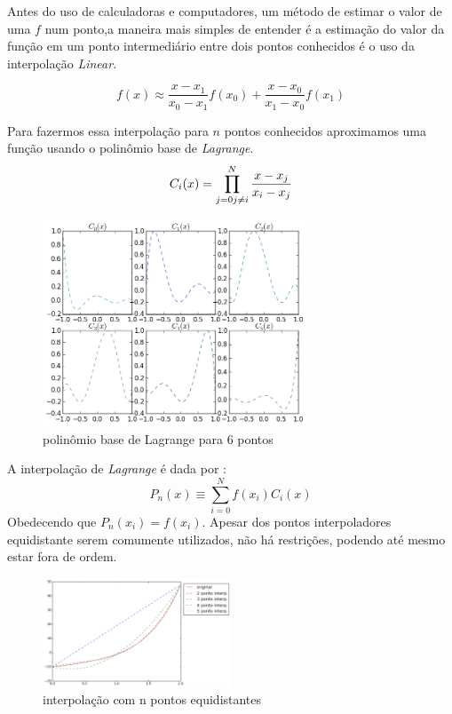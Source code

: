 Antes do uso de calculadoras e computadores, um método de estimar o valor de uma $f$ num ponto,a   maneira mais simples de entender é a estimação do valor da função em um ponto intermediário entre dois pontos conhecidos é o uso da interpolação \emph{Linear}.

\begin{equation}
	f(x) \approx \frac{x - x_1}{x_0 - x_1}f(x_0)  + \frac{x - x_0}{x_1 - x_0}f(x_1)
\end{equation} 
 
 Para fazermos essa interpolação para $n$ pontos conhecidos aproximamos uma função usando o polinômio base de \emph{Lagrange}.
\begin{equation}
C_i(x) = \prod_{j = 0 \\ j \neq i}^{N} \frac{x - x_j}{x_i - x_j} 
\end{equation} 

\begin{figure}[!h]
\includegraphics[width=0.7\textwidth, center ]{figuras/exemplo_polinomio_lagrange.png}
\caption{polinômio base de Lagrange para 6 pontos}
\end{figure}

 A interpolação de \emph{Lagrange} é dada por :
\begin{equation}
 P_n(x) \equiv \sum_{i = 0}^{N} f(x_i)C_i(x) 
\end{equation}
 Obedecendo que $P_n(x_i) = f(x_i)$. Apesar dos pontos interpoladores equidistante serem comumente utilizados, não há restrições, podendo até mesmo estar fora de ordem.
\begin{figure}[h]
  \includegraphics[width=0.5\textwidth, center]{figuras/interpolacao_linear5.png}
  \caption{interpolação com n pontos equidistantes}
\end{figure}


